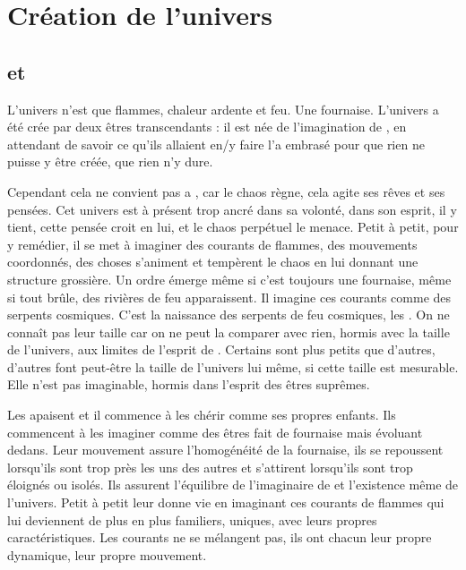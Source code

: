 \chapter{Création de l'univers}


\section{\Mey et \Cind}

L’univers n’est que flammes, chaleur ardente et feu. Une fournaise. L’univers a été crée par deux êtres transcendants : il est née de l’imagination de \Mey, en attendant de savoir ce qu’ils allaient en/y faire \Cind l’a embrasé pour que rien ne puisse y être créée, que rien n’y dure. 

Cependant cela ne convient pas a \Mey, car le chaos règne, cela agite ses rêves et ses pensées. Cet univers est à présent trop ancré dans sa volonté, dans son esprit, il y tient, cette pensée croit en lui, et le chaos perpétuel le menace. Petit à petit, pour y remédier, il se met à imaginer des courants de flammes, des mouvements coordonnés, des choses s’animent et tempèrent le chaos en lui donnant une structure grossière. Un ordre émerge même si c’est toujours une fournaise, même si tout brûle, des rivières de feu apparaissent. Il imagine ces courants comme des serpents cosmiques. C’est la naissance des serpents de feu cosmiques, les \SerpentsCosmiques. On ne connaît pas leur taille car on ne peut la comparer avec rien, hormis avec la taille de l’univers, aux limites de l’esprit de \Mey. Certains sont plus petits que d’autres, d’autres font peut-être la taille de l’univers lui même, si cette taille est mesurable. Elle n’est pas imaginable, hormis dans l’esprit des êtres suprêmes.

Les \SerpentsCosmiques apaisent \Mey et il commence à les chérir comme ses propres enfants. Ils commencent à les imaginer comme des êtres fait de fournaise mais évoluant dedans. Leur mouvement assure l’homogénéité de la fournaise, ils se repoussent lorsqu’ils sont trop près les uns des autres et s’attirent lorsqu’ils sont trop éloignés ou isolés. Ils assurent l’équilibre de l’imaginaire de \Mey et l’existence même de l’univers. Petit à petit \Mey leur donne vie en imaginant ces courants de flammes qui lui deviennent de plus en plus familiers, uniques, avec leurs propres caractéristiques. Les courants ne se mélangent pas, ils ont chacun leur propre dynamique, leur propre mouvement.

